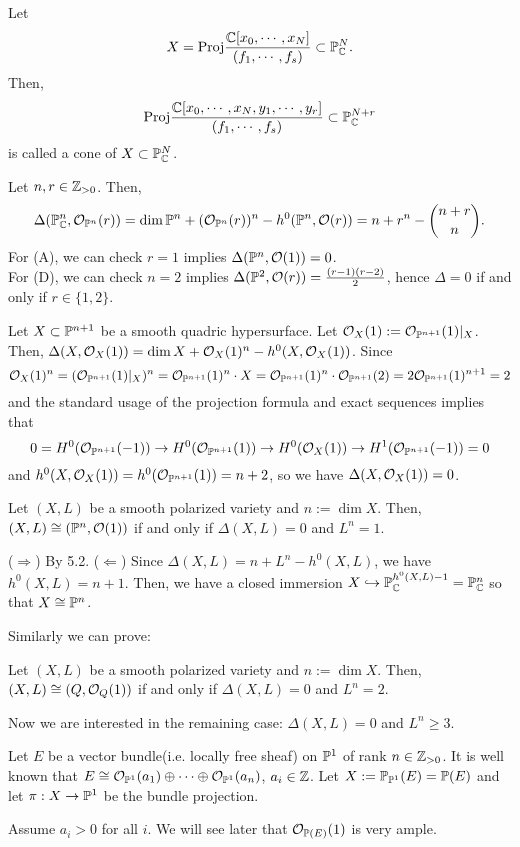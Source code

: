 \documentclass{../../small}
\begin{document}
\begin{defn}
Let
\[X=\mathrm{Proj}\frac{\C[x_0,\cdots,x_N]}{(f_1,\cdots,f_s)}\subset\P_\C^N.\]
Then,
\[\mathrm{Proj}\frac{\C[x_0,\cdots,x_N,y_1,\cdots,y_r]}{(f_1,\cdots,f_s)}\subset\P_\C^{N+r}\]
is called a cone of $X\subset\P_\C^N$.
\end{defn}
\begin{ex}[(A)+(D)]
Let $n,r\in\Z_{>0}$.
Then,
\[\Delta(\P_\C^n,\cO_{\P^n}(r))=\dim\P^n+(\cO_{\P^n}(r))^n-h^0(\P^n,\cO(r))=n+r^n-{n+r\choose n}.\]
For (A), we can check $r=1$ implies $\Delta(\P^n,\cO(1))=0$.\\
For (D), we can check $n=2$ implies $\Delta(\P^2,\cO(r))=\frac{(r-1)(r-2)}2$, hence $\Delta=0$ if and only if $r\in\{1,2\}$.
\end{ex}
\begin{ex}[(B)]
Let $X\subset\P^{n+1}$ be a smooth quadric hypersurface.
Let $\cO_X(1):=\cO_{\P^{n+1}}(1)|_X$.
Then, $\Delta(X,\cO_X(1))=\dim X+\cO_X(1)^n-h^0(X,\cO_X(1))$.
Since
\[\cO_X(1)^n=(\cO_{\P^{n+1}}(1)|_X)^n=\cO_{\P^{n+1}}(1)^n\cdot X=\cO_{\P^{n+1}}(1)^n\cdot\cO_{\P^{n+1}}(2)=2\cO_{\P^{n+1}}(1)^{n+1}=2\]
and the standard usage of the projection formula and exact sequences implies that
\[0=H^0(\cO_{\P^{n+1}}(-1))\to H^0(\cO_{\P^{n+1}}(1))\to H^0(\cO_X(1))\to H^1(\cO_{\P^{n+1}}(-1))=0\]
and $h^0(X,\cO_X(1))=h^0(\cO_{\P^{n+1}}(1))=n+2$, so we have $\Delta(X,\cO_X(1))=0$.
\end{ex}

\begin{thm}[(A)]
Let $(X,L)$ be a smooth polarized variety and $n:=\dim X$.
Then, $(X,L)\cong(\P^n,\cO(1))$ if and only if $\Delta(X,L)=0$ and $L^n=1$.	
\end{thm}
\begin{pf}
($\Rightarrow$) By 5.2.
($\Leftarrow$)
Since $\Delta(X,L)=n+L^n-h^0(X,L)$, we have $h^0(X,L)=n+1$.
Then, we have a closed immersion $X\hookrightarrow\P_\C^{h^0(X,L)-1}=\P_\C^n$ so that $X\cong\P^n$.
\end{pf}
Similarly we can prove:
\begin{thm}[(B)]
Let $(X,L)$ be a smooth polarized variety and $n:=\dim X$.
Then, $(X,L)\cong(Q,\cO_Q(1))$ if and only if $\Delta(X,L)=0$ and $L^n=2$.
\end{thm}

Now we are interested in the remaining case: $\Delta(X,L)=0$ and $L^n\ge3$.

\begin{rmk}[(C)]
Let $E$ be a vector bundle(i.e. locally free sheaf) on $\P^1$ of rank $n\in\Z_{>0}$.
It is well known that $E\cong\cO_{\P^1}(a_1)\oplus\cdots\oplus\cO_{\P^1}(a_n)$, $a_i\in\Z$.
Let $X:=\P_{\P^1}(E)=\P(E)$ and let $\pi:X\to\P^1$ be the bundle projection.

Assume $a_i>0$ for all $i$.
We will see later that $\cO_{\P(E)}(1)$ is very ample.
\end{rmk}
\end{document}
